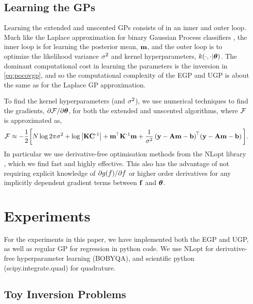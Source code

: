 \documentclass{article} %
\begin{document}
\subsection{Learning the GPs}

Learning the extended and unscented GPs consists of in an inner and outer loop.
Much like the Laplace approximation for binary Gaussian Process classifiers
\cite{Rasmussen2006}, the inner loop is for learning the posterior mean,
$\mathbf{m}$, and the outer loop is to optimize the likelihood variance $\sigma^2$
and kernel hyperparameters, $k\!\left({{\cdot}, {\cdot|\boldsymbol\theta}}\right)$. The dominant
computational cost in learning the parameters is the inversion in
\eqref{eq:pocovgp}, and so the computational complexity of the EGP and UGP is
about the same as for the Laplace GP approximation.

To find the kernel hyperparameters (and $\sigma^2$), we use numerical techniques
to find the gradients, $\partial\mathcal{F}/\partial\boldsymbol\theta$, for both the extended
and unscented algorithms, where $\mathcal{F}$ is approximated as,
\begin{equation}
    \mathcal{F} \approx - \frac{1}{2} \bigg[
        N\log{2\pi\ensuremath{\sigma^2}} + \log\left|{\mathbf{K}\mathbf{C}^{\text{-}1}}\right|
    + \mathbf{m}^{\!\top}\mathbf{K}^{\text{-}1} \mathbf{m}
    + \frac{1}{\sigma^2}
        \left({\mathbf{y} - \mathbf{A}\mathbf{m} - \mathbf{b}}\right)^{\!\top}\!
        \left({\mathbf{y} - \mathbf{A}\mathbf{m} - \mathbf{b}}\right)
    \bigg].
    \label{eq:fengygp}
\end{equation}
In particular we use derivative-free optimisation methods
from the NLopt library \cite{JohnsonNLOPT}, which we find fast and highly
effective. This also has the advantage of not requiring explicit knowledge of
$\partial g\!\left({{f}}\right)\!/\partial f$ or higher order derivatives for
any implicitly dependent gradient terms between $\mathbf{f}$ and $\boldsymbol\theta$. 


\section{Experiments}
\label{sec:experiments}

For the experiments in this paper, we have implemented both the EGP and UGP, as
well as regular GP for regression in python code. We use NLopt
\cite{JohnsonNLOPT} for derivative-free hyperparameter learning (BOBYQA), and
scientific python \cite{JonesScipy} (scipy.integrate.quad) for quadrature.


\subsection{Toy Inversion Problems}
\label{sec:exptoy}
\end{document}
